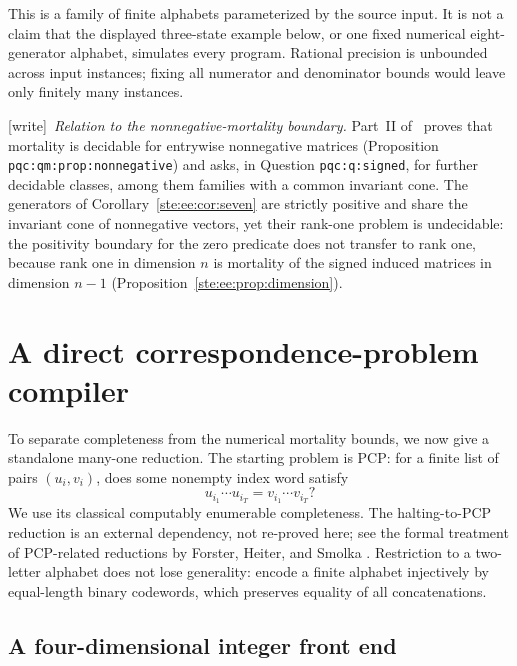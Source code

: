 \documentclass[11pt,letterpaper]{article}
\theoremstyle{definition}
\theoremstyle{remark}
\newcommand{\wtag}{\textup{[write]}}
\begin{document}
This is a family of finite alphabets parameterized by the source input. It is
not a claim that the displayed three-state example below, or one fixed numerical
eight-generator alphabet, simulates every program. Rational precision is
unbounded across input instances; fixing all numerator and denominator bounds
would leave only finitely many instances.

\wtag\ \emph{Relation to the nonnegative-mortality boundary.} Part~II of~\cite{pqc} proves that mortality is decidable for entrywise nonnegative matrices (Proposition \texttt{pqc:qm:prop:nonnegative}) and asks, in Question \texttt{pqc:q:signed}, for further decidable classes, among them families with a common invariant cone. The generators of Corollary~\ref{ste:ee:cor:seven} are strictly positive and share the invariant cone of nonnegative vectors, yet their rank-one problem is undecidable: the positivity boundary for the zero predicate does not transfer to rank one, because rank one in dimension $n$ is mortality of the signed induced matrices in dimension $n-1$ (Proposition~\ref{ste:ee:prop:dimension}).

\section{A direct correspondence-problem compiler}
\label{ste:ee:sec:pcp}

To separate completeness from the numerical mortality bounds, we now give a
standalone many-one reduction. The starting problem is PCP: for a finite list of
pairs $(u_i,v_i)$, does some nonempty index word satisfy
\[
 u_{i_1}\cdots u_{i_T}=v_{i_1}\cdots v_{i_T}?
\]
We use its classical computably enumerable completeness. The halting-to-PCP
reduction is an external dependency, not re-proved here; see the formal treatment
of PCP-related reductions by Forster, Heiter, and Smolka \cite{forster}.
Restriction to a two-letter alphabet does not lose generality: encode a finite
alphabet injectively by equal-length binary codewords, which preserves equality
of all concatenations.

\subsection{A four-dimensional integer front end}
\end{document}
